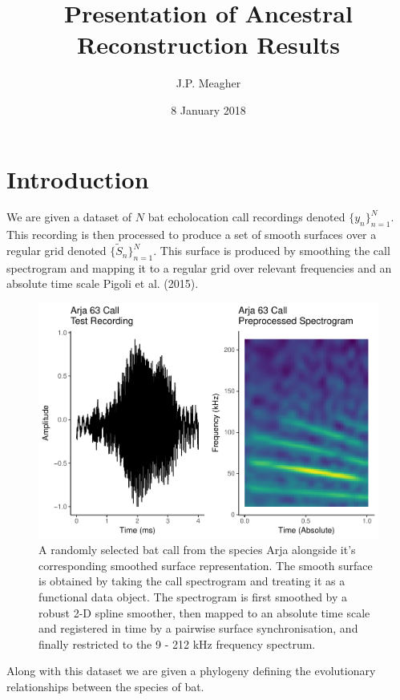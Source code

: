 \documentclass[]{article}
\title{Presentation of Ancestral Reconstruction Results}
\author{J.P. Meagher}
\date{8 January 2018}
\begin{document}
\maketitle

\section{Introduction}\label{introduction}

We are given a dataset of \(N\) bat echolocation call recordings denoted
\(\{y_n\}_{n = 1}^N\). This recording is then processed to produce a set
of smooth surfaces over a regular grid denoted
\(\{\tilde{S}_n\}_{n=1}^{N}\). This surface is produced by smoothing the
call spectrogram and mapping it to a regular grid over relevant
frequencies and an absolute time scale Pigoli et al. (2015).

\begin{figure}
\centering
\includegraphics{for_mark_files/figure-latex/recording figure-1.pdf}
\caption{A randomly selected bat call from the species Arja alongside
it's corresponding smoothed surface representation. The smooth surface
is obtained by taking the call spectrogram and treating it as a
functional data object. The spectrogram is first smoothed by a robust
2-D spline smoother, then mapped to an absolute time scale and
registered in time by a pairwise surface synchronisation, and finally
restricted to the 9 - 212 kHz frequency spectrum.}
\end{figure}

Along with this dataset we are given a phylogeny defining the
evolutionary relationships between the species of bat.
\end{document}
